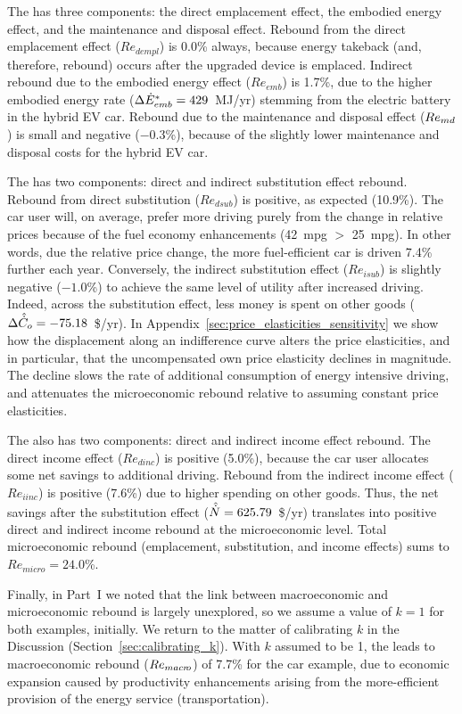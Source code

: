 \documentclass[12pt]{article}\usepackage[]{graphicx}\usepackage[]{xcolor}
\begin{document}
The \empleffect{} has three components:
the direct emplacement effect, 
the embodied energy effect, and 
the maintenance and disposal effect.
Rebound from the direct emplacement effect 
($Re_{dempl}$) is 0.0\% always, 
because energy takeback (and, therefore, rebound)
occurs after the upgraded device is emplaced.
Indirect rebound due to the embodied energy effect
($Re_{emb}$) is 1.7\%,  
due to the higher embodied energy rate
($\Delta {\dot{E}}^*_{emb} = 429$~MJ/yr)
stemming from the electric battery in the hybrid EV car.
Rebound due to the maintenance and disposal effect
($Re_{md}$) is small and negative
($-0.3$\%),
because of the slightly lower maintenance and disposal costs
for the hybrid EV car.

The \subeffect{} has two components:
direct and indirect substitution effect rebound.
Rebound from direct substitution ($Re_{dsub}$) is 
positive, as expected (10.9\%). 
The car user will, on average, prefer more driving purely 
from the change in relative prices because of the fuel economy enhancements
(42~mpg $>$ 25~mpg).
In other words, 
due the relative price change,
the more fuel-efficient car is driven 7.4\% further
each year. 
Conversely, the indirect substitution effect ($Re_{isub}$)
is slightly negative ($-1.0$\%)
to achieve the same level of utility after increased driving. 
Indeed, across the substitution effect,
less money is spent on other goods
($\Delta \hat{\dot{C}}_o = -75.18$~\$/yr).
In Appendix~\ref{sec:price_elasticities_sensitivity} we show how the
displacement along an indifference curve alters the price elasticities,
and in particular, that the uncompensated own price elasticity declines
in magnitude. The decline slows the rate of additional consumption of
energy intensive driving, and attenuates the microeconomic rebound
relative to assuming constant price elasticities.

The \inceffect{} also has two components:
direct and indirect income effect rebound.
The direct income effect
($Re_{dinc}$) is positive
(5.0\%), 
because the car user allocates some
net savings to additional driving. 
Rebound from the indirect income effect 
($Re_{iinc}$) is positive (7.6\%)
due to higher spending on other goods. 
Thus, the net savings after the substitution effect
($\hat{\dot{N}} = 625.79$~\$/yr) 
translates into positive direct and indirect income
rebound at the microeconomic level. 
Total microeconomic rebound (emplacement, substitution, and income effects)
sums to $Re_{micro} = 24.0$\%.

Finally, in Part~I we noted that 
the link between macroeconomic and microeconomic rebound 
is largely unexplored, 
so we assume a value of $k = 1$ for both examples, initially.
We return to the matter of calibrating $k$
in the Discussion (Section~\ref{sec:calibrating_k}).
With $k$ assumed to be 1,
the \macroeffect{} leads to macroeconomic rebound
($Re_{macr\!o}$) of 7.7\% 
for the car example,
due to economic expansion caused by 
productivity enhancements arising from the more-efficient provision of the 
energy service (transportation).
\end{document}
